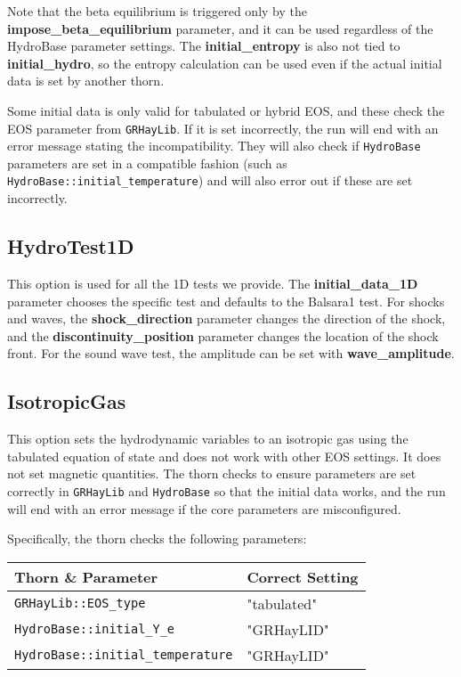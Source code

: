 \documentclass{article}
\newcommand{\glib}{\texttt{GRHayLib}\xspace}
\newcommand{\hbase}{\texttt{HydroBase}\xspace}
\begin{document}
Note that the beta equilibrium is triggered only by the
\textbf{impose\_beta\_equilibrium} parameter, and it can be
used regardless of the HydroBase parameter settings. The
\textbf{initial\_entropy} is also not tied to \textbf{initial\_hydro},
so the entropy calculation can be used even if the actual initial
data is set by another thorn.

Some initial data is only valid for tabulated or hybrid EOS, and
these check the EOS parameter from \glib. If it is set incorrectly,
the run will end with an error message stating the incompatibility.
They will also check if \hbase parameters are set in a compatible
fashion (such as \texttt{HydroBase::initial\_temperature}) and
will also error out if these are set incorrectly.

\subsection{HydroTest1D}

This option is used for all the 1D tests we provide. The
\textbf{initial\_data\_1D} parameter chooses the
specific test and defaults to the Balsara1 test. For shocks and
waves, the \textbf{shock\_direction} parameter changes the
direction of the shock, and the \textbf{discontinuity\_position}
parameter changes the location of the shock front. For the sound
wave test, the amplitude can be set with \textbf{wave\_amplitude}.

\subsection{IsotropicGas}

This option sets the hydrodynamic variables to an isotropic gas using
the tabulated equation of state and does not work with other EOS
settings. It does not set magnetic quantities. The thorn checks to
ensure parameters are set correctly in \glib and
\hbase so that the initial data works, and the run will end
with an error message if the core parameters are misconfigured.

Specifically, the thorn checks the following parameters:
\begin{tabular}{l|l}
Thorn \& Parameter & Correct Setting \\\hline
\texttt{GRHayLib::EOS\_type} & "tabulated" \\
\texttt{HydroBase::initial\_Y\_e} & "GRHayLID" \\
\texttt{HydroBase::initial\_temperature} & "GRHayLID"
\end{tabular}
\end{document}

